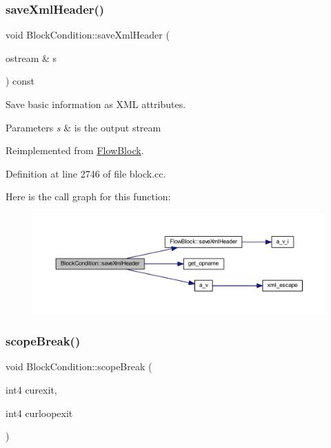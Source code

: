 \subsubsection{\texorpdfstring{saveXmlHeader()}{saveXmlHeader()}}
{\footnotesize\ttfamily void Block\+Condition\+::save\+Xml\+Header (\begin{DoxyParamCaption}\item[{ostream \&}]{s }\end{DoxyParamCaption}) const\hspace{0.3cm}{\ttfamily [virtual]}}



Save basic information as X\+ML attributes. 


\begin{DoxyParams}{Parameters}
{\em s} & is the output stream \\
\hline
\end{DoxyParams}


Reimplemented from \mbox{\hyperlink{class_flow_block_a6cf95f66e3f6940a8342b3e6fdfc5ca2}{Flow\+Block}}.



Definition at line 2746 of file block.\+cc.

Here is the call graph for this function\+:
\nopagebreak
\begin{figure}[H]
\begin{center}
\leavevmode
\includegraphics[width=350pt]{class_block_condition_a1e24ce75951cb7a66b281eeabe7854c0_cgraph}
\end{center}
\end{figure}
\mbox{\label{class_block_condition_ab25a80cf066d355146cd5b4a67d91f46}} 
\subsubsection{\texorpdfstring{scopeBreak()}{scopeBreak()}}
{\footnotesize\ttfamily void Block\+Condition\+::scope\+Break (\begin{DoxyParamCaption}\item[{int4}]{curexit,  }\item[{int4}]{curloopexit }\end{DoxyParamCaption})\hspace{0.3cm}{\ttfamily [virtual]}}



